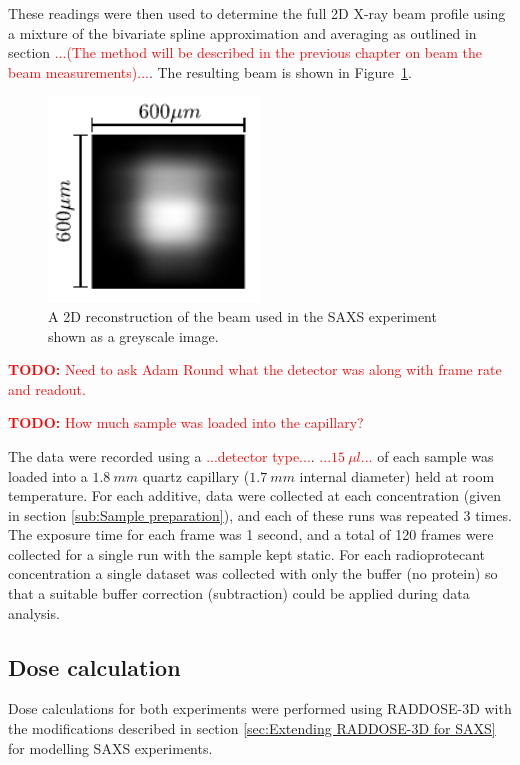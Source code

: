 These readings were then used to determine the full 2D X-ray beam profile using a mixture of the bivariate spline approximation and averaging as outlined in section \textcolor{red}{...(The method will be described in the previous chapter on beam the beam measurements)...}. The resulting beam is shown in Figure~\ref{fig:SAXS beam profile}.
\begin{figure}
    \centering
    \includegraphics[width=0.5\textwidth]{figures/saxs/SAXS_beam.pdf}
    \caption{A 2D reconstruction of the beam used in the SAXS experiment shown as a greyscale image.}
    \label{fig:SAXS beam profile}
\end{figure}

\textcolor{red}{
    \begin{myenumerate}
        \item \hypertarget{todo:Detector type}{\textbf{TODO:} Need to ask Adam Round what the detector was along with frame rate and readout.}
        \item \hypertarget{todo:Detector type}{\textbf{TODO:} How much sample was loaded into the capillary?}
    \end{myenumerate}
}
The data were recorded using a \textcolor{red}{...detector type...}.
\textcolor{red}{...$15\ \mu l$...} of each sample was loaded into a $1.8\ mm$ quartz capillary ($1.7\ mm$ internal diameter) held at room temperature.
For each additive, data were collected at each concentration (given in section \ref{sub:Sample preparation}), and each of these runs was repeated 3 times.
The exposure time for each frame was 1 second, and a total of 120 frames were collected for a single run with the sample kept static.
For each radioprotecant concentration a single dataset was collected with only the buffer (no protein) so that a suitable buffer correction (subtraction) could be applied during data analysis.

\subsection{Dose calculation}
\label{sub:Dose calculation}
Dose calculations for both experiments were performed using RADDOSE-3D with the modifications described in section \ref{sec:Extending RADDOSE-3D for SAXS} for modelling SAXS experiments.

